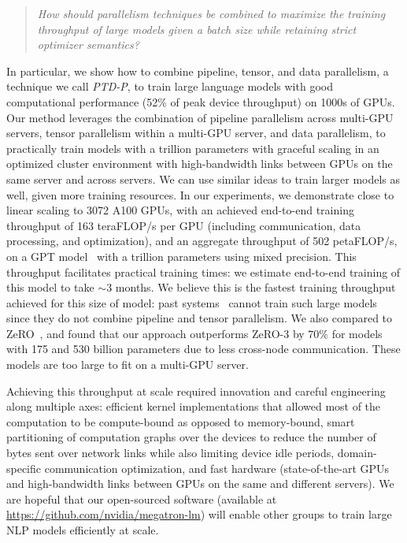 \begin{quote}
    \emph{How should parallelism techniques be combined to maximize the training throughput of large models given a batch size while retaining strict optimizer semantics?}
\end{quote}

In particular, we show how to combine pipeline, tensor, and data parallelism, a technique we call \emph{PTD-P}, to train large language models with good computational performance (52\% of peak device throughput) on 1000s of GPUs. Our method leverages the combination of pipeline parallelism across multi-GPU servers, tensor parallelism within a multi-GPU server, and data parallelism, to practically train models with a trillion parameters with graceful scaling in an optimized cluster environment with high-bandwidth links between GPUs on the same server and across servers. We can use similar ideas to train larger models as well, given more training resources. In our experiments, we demonstrate close to linear scaling to 3072 A100 GPUs, with an achieved end-to-end training throughput of 163 teraFLOP/s per GPU (including communication, data processing, and optimization), and an aggregate throughput of 502 petaFLOP/s, on a GPT model~\cite{gpt3} with a trillion parameters using mixed precision. This throughput facilitates practical training times: we estimate end-to-end training of this model to take $\sim 3$ months. We believe this is the fastest training throughput achieved for this size of model: past systems~\cite{shoeybi2019megatron, narayanan2019pipedream} cannot train such large models since they do not combine pipeline and tensor parallelism. We also compared to ZeRO~\cite{rajbhandari2019zero}, and found that our approach outperforms ZeRO-3 by $70\%$ for models with 175 and 530 billion parameters due to less cross-node communication. These models are too large to fit on a multi-GPU server.

Achieving this throughput at scale required innovation and careful engineering along multiple axes: efficient kernel implementations that allowed most of the computation to be compute-bound as opposed to memory-bound, smart partitioning of computation graphs over the devices to reduce the number of bytes sent over network links while also limiting device idle periods, domain-specific communication optimization, and fast hardware (state-of-the-art GPUs and high-bandwidth links between GPUs on the same and different servers). We are hopeful that our open-sourced software (available at \url{https://github.com/nvidia/megatron-lm}) will enable other groups to train large NLP models efficiently at scale. 

